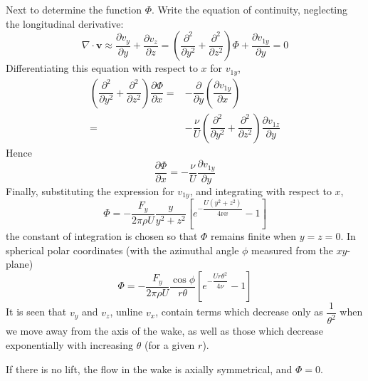 \documentclass[conference]{IEEEtran}
\theoremstyle{definition}
\theoremstyle{remark}
\begin{document}
    Next to determine the function $\Phi$. Write the equation of continuity, neglecting the longitudinal derivative:
    \begin{equation}
        \nabla \cdot \mathbf{v} \approx \dfrac{\partial v_y}{\partial y} + \dfrac{\partial v_z}{\partial z} = \left( \dfrac{\partial^2}{\partial y^2} + \dfrac{\partial^2}{\partial z^2} \right) \Phi + \dfrac{\partial v_{1y}}{\partial y} = 0
    \end{equation}
    Differentiating this equation with respect to $x$ for $v_{1y}$,
    \begin{align*}
        \left( \dfrac{\partial^2}{\partial y^2} + \dfrac{\partial^2}{\partial z^2} \right) \dfrac{\partial \Phi}{\partial x} =& -\dfrac{\partial}{\partial y} \left( \dfrac{\partial v_{1y}}{\partial x} \right) \\
        =& -\dfrac{\nu}{U} \left( \dfrac{\partial^2}{\partial y^2} + \dfrac{\partial^2}{\partial z^2} \right) \dfrac{\partial v_{1z}}{\partial y}
    \end{align*}
    Hence
    \begin{equation*}
        \dfrac{\partial \Phi}{\partial x} = - \dfrac{\nu}{U} \dfrac{\partial v_{1y}}{\partial y}
    \end{equation*}
    Finally, substituting the expression for $v_{1y}$, and integrating with respect to $x$,
    \begin{equation}
        \Phi = -\dfrac{F_y}{2 \pi \rho U} \dfrac{y}{y^2 + z^2} \left[ e^{-\dfrac{U(y^2 + z^2)}{4\nu x}} - 1 \right]
        \label{eq:Phi}
    \end{equation}
    the constant of integration is chosen so that $\Phi$ remains finite when $y = z = 0$. In spherical polar coordinates (with the azimuthal angle $\phi$ measured from the $xy$-plane)
    \begin{equation}
        \Phi = -\dfrac{F_y}{2 \pi \rho U} \dfrac{\cos \phi}{r \theta} \left[ e^{-\dfrac{Ur\theta^2}{4\nu}} - 1 \right]
        \label{eq:Phi_theta}
    \end{equation}
    It is seen that $v_y$ and $v_z$, unline $v_x$, contain terms which decrease only as $\dfrac1{\theta^2}$ when we move away from the axis of the wake, as well as those which decrease exponentially with increasing $\theta$ (for a given $r$).

    If there is no lift, the flow in the wake is axially symmetrical, and $\Phi = 0$.
\end{document}
